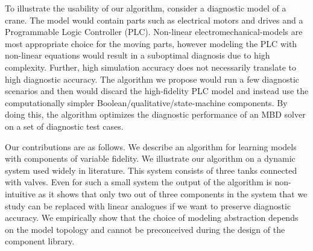 \par
To illustrate the usability of our algorithm, consider a diagnostic
model of a crane. The model would contain parts such as electrical
motors and drives and a Programmable Logic Controller
(PLC). Non-linear electromechanical-models are most appropriate choice
for the moving parts, however modeling the PLC with non-linear
equations would result in a suboptimal diagnosis due to high
complexity. Further, high simulation accuracy does not necessarily
translate to high diagnostic accuracy. The algorithm we propose would
run a few diagnostic scenarios and then would discard the
high-fidelity PLC model and instead use the computationally simpler
Boolean/qualitative/state-machine components. By doing this, the
algorithm optimizes the diagnostic performance of an MBD solver on a
set of diagnostic test cases.
\par
Our contributions are as follows. We describe an algorithm for
learning models with components of variable fidelity.  We illustrate
our algorithm on a dynamic system used widely in literature. This
system consists of three tanks connected with valves. Even for such a
small system the output of the algorithm is non-intuitive as it shows
that only two out of three components in the system that we study can
be replaced with linear analogues if we want to preserve diagnostic
accuracy. We empirically show that the choice of modeling abstraction
depends on the model topology and cannot be preconceived during the
design of the component library.
